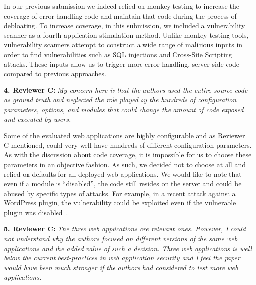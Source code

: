 \noindent In our previous submission we indeed relied on monkey-testing to increase the coverage of error-handling code and maintain that code during the process of debloating. To increase coverage, in this submission, we included a vulnerability scanner as a fourth application-stimulation method. Unlike monkey-testing tools, vulnerability scanners attempt to construct a wide range of malicious inputs in order to find vulnerabilities such as SQL injections and Cross-Site Scripting attacks. These inputs allow us to trigger more error-handling, server-side code compared to previous approaches.

\vspace{1ex}

\noindent \textbf{4. Reviewer C:} \textit{My concern here is that the authors used the entire source code as ground truth and neglected the role played by the hundreds of configuration parameters, options, and modules that could change the amount of code exposed and executed by users.}
\vspace{0.5ex}

\noindent Some of the evaluated web applications are highly configurable and as Reviewer C mentioned, could very well have hundreds of different configuration parameters. As with the discussion about code coverage, it is impossible for us to choose these parameters in an objective fashion. As such, we decided not to choose at all and relied on defaults for all deployed web applications. We would like to note that even if a module is ``disabled'', the code still resides on the server and could be abused by specific types of attacks. For example, in a recent attack against a WordPress plugin, the vulnerability could be exploited even if the vulnerable plugin was disabled~\cite{wordpressPlugin}.

\vspace{1ex}

\noindent \textbf{5. Reviewer C:} \textit{The three web applications are relevant ones. However, I could not understand why the authors focused on different versions of the same web applications and the added value of such a decision. Three web applications is well below the current best-practices in web application security and I feel the paper would have been much stronger if the authors had considered to test more web applications.}
\vspace{0.5ex}

